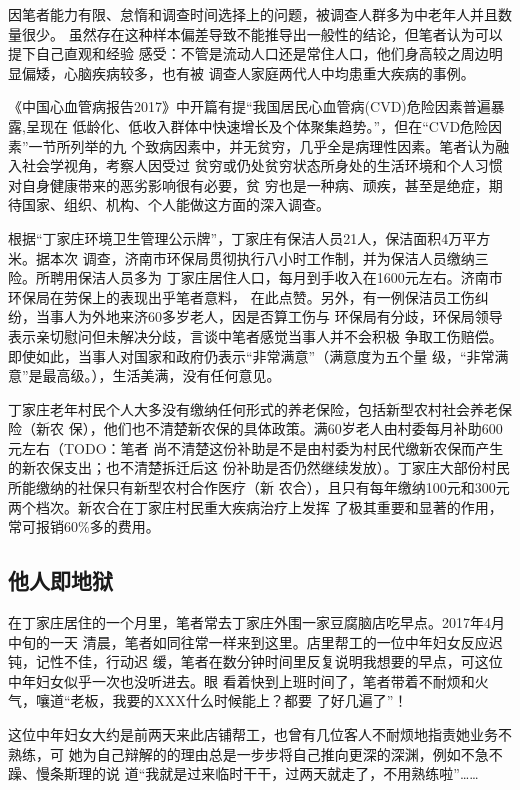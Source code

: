 因笔者能力有限、怠惰和调查时间选择上的问题，被调查人群多为中老年人并且数量很少。
虽然存在这种样本偏差导致不能推导出一般性的结论，但笔者认为可以提下自己直观和经验
感受：不管是流动人口还是常住人口，他们身高较之周边明显偏矮，心脑疾病较多，也有被
调查人家庭两代人中均患重大疾病的事例。

《中国心血管病报告2017》中开篇有提“我国居民心血管病(CVD)危险因素普遍暴露,呈现在
低龄化、低收入群体中快速增长及个体聚集趋势。”，但在“CVD危险因素”一节所列举的九
个致病因素中，并无贫穷，几乎全是病理性因素。笔者认为融入社会学视角，考察人因受过
贫穷或仍处贫穷状态所身处的生活环境和个人习惯对自身健康带来的恶劣影响很有必要，贫
穷也是一种病、顽疾，甚至是绝症，期待国家、组织、机构、个人能做这方面的深入调查。

根据“丁家庄环境卫生管理公示牌”，丁家庄有保洁人员21人，保洁面积4万平方米。据本次
调查，济南市环保局贯彻执行八小时工作制，并为保洁人员缴纳三险。所聘用保洁人员多为
丁家庄居住人口，每月到手收入在1600元左右。济南市环保局在劳保上的表现出乎笔者意料，
在此点赞。另外，有一例保洁员工伤纠纷，当事人为外地来济60多岁老人，因是否算工伤与
环保局有分歧，环保局领导表示亲切慰问但未解决分歧，言谈中笔者感觉当事人并不会积极
争取工伤赔偿。即使如此，当事人对国家和政府仍表示“非常满意”（满意度为五个量
级，“非常满意”是最高级。），生活美满，没有任何意见。

丁家庄老年村民个人大多没有缴纳任何形式的养老保险，包括新型农村社会养老保险（新农
保），他们也不清楚新农保的具体政策。满60岁老人由村委每月补助600元左右（TODO：笔者
尚不清楚这份补助是不是由村委为村民代缴新农保而产生的新农保支出；也不清楚拆迁后这
份补助是否仍然继续发放）。丁家庄大部份村民所能缴纳的社保只有新型农村合作医疗（新
农合），且只有每年缴纳100元和300元两个档次。新农合在丁家庄村民重大疾病治疗上发挥
了极其重要和显著的作用，常可报销60\%多的费用。

\subsection{他人即地狱}

在丁家庄居住的一个月里，笔者常去丁家庄外围一家豆腐脑店吃早点。2017年4月中旬的一天
清晨，笔者如同往常一样来到这里。店里帮工的一位中年妇女反应迟钝，记性不佳，行动迟
缓，笔者在数分钟时间里反复说明我想要的早点，可这位中年妇女似乎一次也没听进去。眼
看着快到上班时间了，笔者带着不耐烦和火气，嚷道“老板，我要的XXX什么时候能上？都要
了好几遍了”！

这位中年妇女大约是前两天来此店铺帮工，也曾有几位客人不耐烦地指责她业务不熟练，可
她为自己辩解的的理由总是一步步将自己推向更深的深渊，例如不急不躁、慢条斯理的说
道“我就是过来临时干干，过两天就走了，不用熟练啦”……

